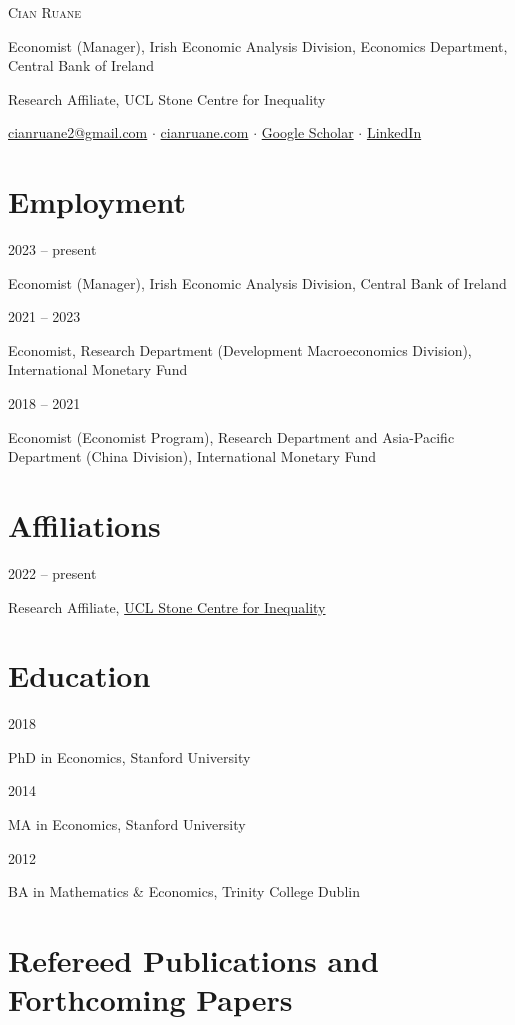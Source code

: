 \documentclass[10pt,a4paper]{article}
\let\oldsection\section
\renewcommand{\section}{\Needspace*{5\baselineskip}\oldsection}
\newlength{\yearw}\setlength{\yearw}{2.35cm}
\newcommand{\entry}[2]{%
  \par\noindent
  \begin{minipage}[t]{\yearw}\strut\color{grey}\small #1\end{minipage}%
  \hspace{0.25cm}%
  \begin{minipage}[t]{\dimexpr\textwidth-\yearw-0.25cm\relax}\strut #2\end{minipage}%
  \par\vspace{4pt}}
\begin{document}
{\Huge\scshape Cian Ruane}\par\vspace{5pt}
{\color{grey}Economist (Manager), Irish Economic Analysis Division, Economics Department, Central Bank of Ireland\par
Research Affiliate, UCL Stone Centre for Inequality}\par\vspace{7pt}
\href{mailto:cianruane2@gmail.com}{cianruane2@gmail.com} \quad$\cdot$\quad
\href{https://www.cianruane.com}{cianruane.com} \quad$\cdot$\quad
\href{https://scholar.google.com/citations?user=1qoMaBkAAAAJ}{Google Scholar} \quad$\cdot$\quad
\href{https://www.linkedin.com/in/cian-ruane-a4b4a42b}{LinkedIn}
\par\vspace{2pt}

\section*{Employment}
\entry{2023 -- present}{Economist (Manager), Irish Economic Analysis Division, Central Bank of Ireland}
\entry{2021 -- 2023}{Economist, Research Department (Development Macroeconomics Division), International Monetary Fund}
\entry{2018 -- 2021}{Economist (Economist Program), Research Department and Asia-Pacific Department (China Division), International Monetary Fund}

\section*{Affiliations}
\entry{2022 -- present}{Research Affiliate, \href{https://www.stone-econ.org/}{UCL Stone Centre for Inequality}}

\section*{Education}
\entry{2018}{PhD in Economics, Stanford University}
\entry{2014}{MA in Economics, Stanford University}
\entry{2012}{BA in Mathematics \& Economics, Trinity College Dublin}

\section*{Refereed Publications and Forthcoming Papers}
\end{document}
